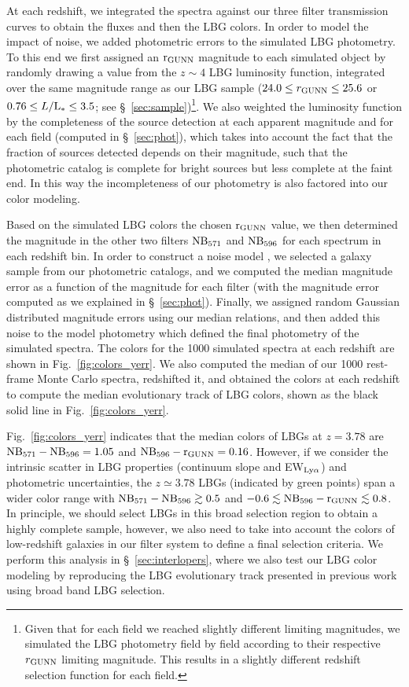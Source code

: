 \documentclass[iop, revtex4]{emulateapj}
\begin{document}
At each redshift, we integrated the spectra against our three filter transmission curves
to obtain the fluxes and then the LBG colors. In order to model the
impact of noise, we added photometric errors to the simulated LBG
photometry. To this end we first assigned an $\rm r_{GUNN}$ magnitude
to each simulated object by randomly drawing a value from the $z\sim4$
LBG luminosity function, integrated over the same magnitude range as
our LBG sample ($24.0 \leq r_{\rm GUNN} \leq 25.6$ or $0.76\leq L/\rm
L_{*}\leq3.5$; see \S~\ref{sec:sample})\footnote{Given that for each
  field we reached slightly different limiting magnitudes, we
  simulated the LBG photometry field by field according to their
  respective $r_{\rm GUNN}$ limiting magnitude. This results in a
  slightly different redshift selection function for each field.}.
We also weighted the luminosity function by the completeness of the
source detection at each apparent magnitude and for each field
(computed in \S~\ref{sec:phot}),
which takes into account the fact that the fraction of sources detected
depends on their magnitude, such that the photometric catalog is complete for bright sources but less complete at the faint end. In this way the incompleteness of our photometry is
also factored into our color modeling.

Based on the simulated LBG colors the chosen $\rm r_{GUNN}$ value, we
then determined the magnitude in the other two filters $\rm NB_{571}$
and $\rm NB_{596}$ for each spectrum in each redshift bin. In order to
construct a noise model , we selected a galaxy sample from our
photometric catalogs, and we computed the median magnitude error as a
function of the magnitude for each filter (with the magnitude error
computed as we explained in \S~\ref{sec:phot}). Finally, we assigned
random Gaussian distributed magnitude errors using our median relations, and then added
this noise to the model photometry which defined the final photometry
of the simulated spectra.  The colors for the 1000 simulated spectra
at each redshift are shown in Fig.~\ref{fig:colors_yerr}.
We also computed the median
of our 1000 rest-frame Monte Carlo spectra, redshifted it, and obtained the colors at each redshift to compute
the median evolutionary track of LBG colors, shown as the black solid line in
Fig.~\ref{fig:colors_yerr}. 

Fig.~\ref{fig:colors_yerr} indicates that the median colors of LBGs at
$z=3.78$ are $\rm NB_{571}-NB_{596}= 1.05$ and $\rm NB_{596}-r_{GUNN}=
0.16$. However, if we consider the 
intrinsic scatter in LBG properties (continuum slope and EW$_{\rm
  Ly\alpha}$) and photometric uncertainties, the $z\simeq 3.78$ LBGs
(indicated by green points) span a wider color range 
with
$\rm NB_{571}-NB_{596} \gtrsim 0.5$ and $-0.6 \lesssim \rm
NB_{596}-r_{GUNN} \lesssim 0.8$. In principle, we should select LBGs
in this broad selection region to obtain a highly complete sample,
however, we also need to take into account the colors of low-redshift
galaxies in our filter system to define a final selection criteria. We
perform this analysis in \S~\ref{sec:interlopers}, where we also test
our LBG color modeling by reproducing the LBG evolutionary track
presented in previous work using broad band LBG selection.
\end{document}
